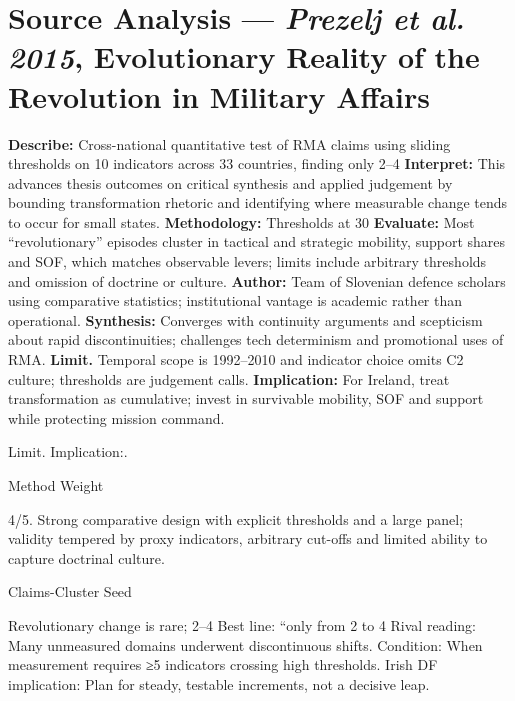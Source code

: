 \section*{Source Analysis — \textit{Prezelj et al. 2015}, Evolutionary Reality of the Revolution in Military Affairs}
\textbf{Describe:} Cross-national quantitative test of RMA claims using sliding thresholds on 10 indicators across 33 countries, finding only 2–4%
\textbf{Interpret:} This advances thesis outcomes on critical synthesis and applied judgement by bounding transformation rhetoric and identifying where measurable change tends to occur for small states.
\textbf{Methodology:} Thresholds at 30%
\textbf{Evaluate:} Most “revolutionary” episodes cluster in tactical and strategic mobility, support shares and SOF, which matches observable levers; limits include arbitrary thresholds and omission of doctrine or culture.
\textbf{Author:} Team of Slovenian defence scholars using comparative statistics; institutional vantage is academic rather than operational.
\textbf{Synthesis:} Converges with continuity arguments and scepticism about rapid discontinuities; challenges tech determinism and promotional uses of RMA.
\textbf{Limit.} Temporal scope is 1992–2010 and indicator choice omits C2 culture; thresholds are judgement calls.
\textbf{Implication:} For Ireland, treat transformation as cumulative; invest in survivable mobility, SOF and support while protecting mission command.

Limit. Implication:.

Method Weight

4/5. Strong comparative design with explicit thresholds and a large panel; validity tempered by proxy indicators, arbitrary cut-offs and limited ability to capture doctrinal culture.

Claims-Cluster Seed

Revolutionary change is rare; 2–4%
Best line: “only from 2 to 4%
Rival reading: Many unmeasured domains underwent discontinuous shifts.
Condition: When measurement requires ≥5 indicators crossing high thresholds.
Irish DF implication: Plan for steady, testable increments, not a decisive leap.

